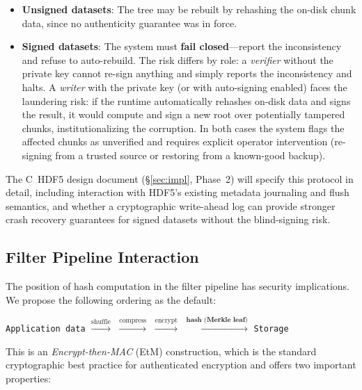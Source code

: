 \documentclass[11pt]{article}
\begin{document}
\begin{itemize}[nosep]
  \item \textbf{Unsigned datasets}: The tree may be rebuilt by rehashing the
    on-disk chunk data, since no authenticity guarantee was in force.
  \item \textbf{Signed datasets}: The system must \textbf{fail closed}---report
    the inconsistency and refuse to auto-rebuild. The risk differs by role:
    a \emph{verifier} without the private key cannot re-sign anything and
    simply reports the inconsistency and halts. A \emph{writer} with the private
    key (or with auto-signing enabled) faces the laundering risk: if the runtime
    automatically rehashes on-disk data and signs the result, it would compute
    and sign a new root over potentially tampered chunks, institutionalizing the
    corruption. In both cases the system flags the affected chunks as unverified
    and requires explicit operator intervention (re-signing from a trusted source
    or restoring from a known-good backup).
\end{itemize}

\noindent The C~HDF5 design document (\S\ref{sec:impl}, Phase~2) will specify
this protocol in detail, including interaction with HDF5's existing metadata
journaling and flush semantics, and whether a cryptographic write-ahead log
can provide stronger crash recovery guarantees for signed datasets without the
blind-signing risk.

\subsection{Filter Pipeline Interaction}
\label{sec:filter-order}

The position of hash computation in the filter pipeline has security
implications. We propose the following ordering as the default:

\begin{center}
\texttt{Application data}
$\xrightarrow{\text{shuffle}}$
$\xrightarrow{\text{compress}}$
$\xrightarrow{\text{encrypt}}$
$\xrightarrow{\textbf{hash (Merkle leaf)}}$
\texttt{Storage}
\end{center}

\noindent This is an \emph{Encrypt-then-MAC} (EtM) construction, which is the
standard cryptographic best practice for authenticated encryption and offers
two important properties:
\end{document}
